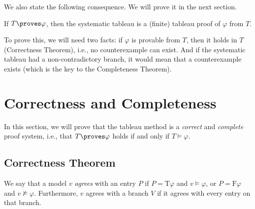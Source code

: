 We also state the following consequence. We will prove it in the next section.

\begin{corollary}\label{corollary:systematicity-of-proofs}
    If $T \proves \varphi$, then the systematic tableau is a (finite) tableau proof of $\varphi$ from $T$.
\end{corollary}

To prove this, we will need two facts: if $\varphi$ is provable from $T$, then it holds in $T$ (Correctness Theorem), i.e., no counterexample can exist. And if the systematic tableau had a non-contradictory branch, it would mean that a counterexample exists (which is the key to the Completeness Theorem).


\section{Correctness and Completeness}

In this section, we will prove that the tableau method is a \emph{correct} and \emph{complete} proof system, i.e., that $T \proves \varphi$ holds if and only if $T \models \varphi$.

\subsection{Correctness Theorem}

We say that a model $v$ \emph{agrees} with an entry $P$ if $P = \mathrm{T}\varphi$ and $v \models \varphi$, or $P = \mathrm{F}\varphi$ and $v \not\models \varphi$. Furthermore, $v$ agrees with a branch $V$ if it agrees with every entry on that branch.

